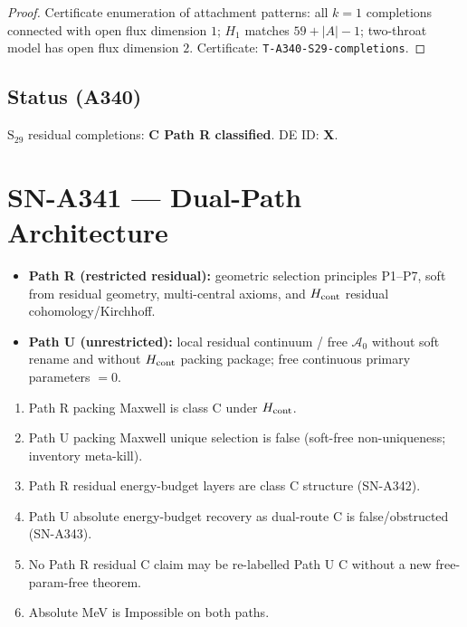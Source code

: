 \begin{proof}
Certificate enumeration of attachment patterns: all $k=1$ completions connected with open flux dimension $1$; $H_1$ matches $59+|A|-1$; two-throat model has open flux dimension $2$. Certificate: \texttt{T-A340-S29-completions}.
\end{proof}

\subsection*{Status (A340)}
$\mathrm{S}_{29}$ residual completions: \textbf{C Path R classified}. DE ID: \textbf{X}.

\section{SN-A341 --- Dual-Path Architecture}
\label{sec:SN-A341}

\begin{definition}
\label{def:A341-paths}
\begin{itemize}
\item \textbf{Path R (restricted residual):} geometric selection principles P1--P7, soft from residual geometry, multi-central axioms, and $H_{\rm cont}$ residual cohomology/Kirchhoff.
\item \textbf{Path U (unrestricted):} local residual continuum / free $\mathcal{A}_0$ without soft rename and without $H_{\rm cont}$ packing package; free continuous primary parameters $=0$.
\end{itemize}
\end{definition}

\begin{theorem}
\label{thm:A341}
\begin{enumerate}[label=(\roman*)]
\item Path R packing Maxwell is class C under $H_{\rm cont}$.
\item Path U packing Maxwell unique selection is false (soft-free non-uniqueness; inventory meta-kill).
\item Path R residual energy-budget layers are class C structure (SN-A342).
\item Path U absolute energy-budget recovery as dual-route C is false/obstructed (SN-A343).
\item No Path R residual C claim may be re-labelled Path U C without a new free-param-free theorem.
\item Absolute MeV is Impossible on both paths.
\end{enumerate}
\end{theorem}

